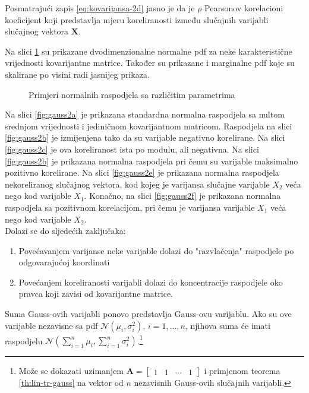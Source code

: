 Posmatrajući zapis \eqref{eq:kovarijansa-2d} jasno je da je $\rho$ Pearsonov
korelacioni koeficijent koji predstavlja mjeru koreliranosti između slučajnih
varijabli slučajnog vektora $\bm X$.

Na slici \ref{fig:gauss2} su prikazane dvodimenzionalne normalne pdf za neke
karakteristične vrijednosti kovarijantne matrice. Također su prikazane i
marginalne pdf koje su skalirane po visini radi jasnijeg prikaza.

\begin{figure}[H]
  \centering
	\caption{Primjeri normalnih raspodjela sa različitim parametrima}
	\label{fig:gauss2}
\end{figure}

Na slici \ref{fig:gauss2a} je prikazana standardna normalna raspodjela sa nultom
srednjom vrijednosti i jediničnom kovarijantnom matricom. Raspodjela na slici
\ref{fig:gauss2b} je izmijenjena tako da su varijable negativno korelirane. Na
slici \ref{fig:gauss2c} je ova koreliranost ista po modulu, ali negativna. Na
slici \ref{fig:gauss2b} je prikazana normalna raspodjela pri čemu su varijable
maksimalno pozitivno korelirane. Na slici \ref{fig:gauss2e} je prikazana
normalna raspodjela nekoreliranog slučajnog vektora, kod kojeg je varijansa
slučajne varijable $X_2$ veća nego kod varijable $X_1$. Konačno, na slici
\ref{fig:gauss2f} je prikazana normalna raspodjela sa pozitivnom korelacijom,
pri čemu je varijansa varijable $X_1$ veća nego kod varijable $X_2$.\\

\noindent
Dolazi se do sljedećih zaključaka:
\begin{enumerate}
	\item Povećavanjem varijanse neke varijable dolazi do "razvlačenja" raspodjele
		po odgovarajućoj koordinati
	\item Povećanjem koreliranosti varijabli dolazi do koncentracije raspodjele
		oko pravca koji zavisi od kovarijantne matrice.
\end{enumerate}

\begin{corollary}
  Suma Gauss-ovih varijabli ponovo predstavlja Gauss-ovu varijablu. Ako su ove
  varijable nezavisne sa pdf $\mathcal{N}(\mu_i, \sigma_i^2)$, $i=1,...,n$,
  njihova suma će imati raspodjelu $ \mathcal{N}(\sum_{i=1}^{n}\mu_i,
  \sum_{i=1}^{n}\sigma_i^2)$.\footnote{
    Može se dokazati uzimanjem $\bm A = \left[
        \begin{array}{cccc}
          1 & 1 & \cdots & 1
        \end{array}\right]$
    i primjenom teorema \ref{th:lin-tr-gauss} na vektor od $n$ nezavisnih
    Gauss-ovih slučajnih varijabli.
  }
\end{corollary}

